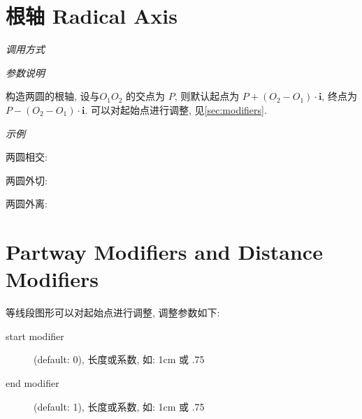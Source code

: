 
\section{根轴 Radical Axis}

\emph{调用方式}

\begin{tcolorbox}{}
\end{tcolorbox}

\emph{参数说明}

构造两圆的根轴, 设与$O_1O_2$ 的交点为 $P$, 则默认起点为 $P+(O_2-O_1) \cdot \mathbf{i}$, 终点为 $P-(O_2-O_1) \cdot \mathbf{i}$.
可以对起始点进行调整, 见\ref{sec:modifiers}.

\emph{示例}

两圆相交:


两圆外切:


两圆外离:


\section{Partway Modifiers and Distance Modifiers}%

等线段图形可以对起始点进行调整, 调整参数如下\cite{CALC}:

\begin{description}
  \item[start modifier] (default: 0), 长度或系数, 如: 1cm 或 .75
  \item[end modifier] (default: 1), 长度或系数, 如: 1cm 或 .75
\end{description}
